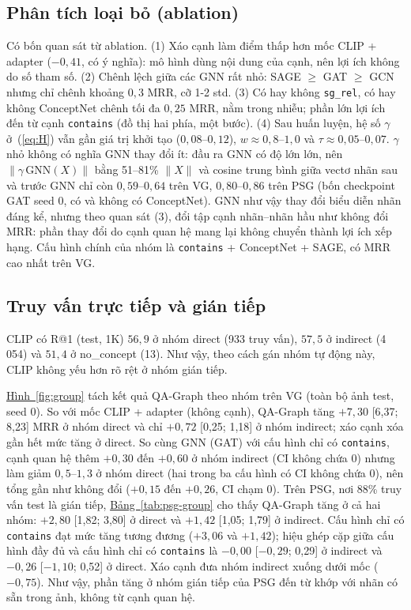 \documentclass[conference]{IEEEtran}
\begin{document}
\subsection{Phân tích loại bỏ (ablation)}\label{sec:r-abl}
Có bốn quan sát từ ablation. (1) Xáo cạnh làm điểm thấp hơn mốc CLIP + adapter ($-0{,}41$, có ý nghĩa): mô hình dùng nội dung của cạnh, nên lợi ích không do số tham số. (2) Chênh lệch giữa các GNN rất nhỏ: SAGE $\ge$ GAT $\ge$ GCN nhưng chỉ chênh khoảng $0{,}3$ MRR, cỡ 1-2 std. (3) Có hay không \texttt{sg\_rel}, có hay không ConceptNet chênh tối đa $0{,}25$ MRR, nằm trong nhiễu; phần lớn lợi ích đến từ cạnh \texttt{contains} (đồ thị hai phía, một bước). (4) Sau huấn luyện, hệ số $\gamma$ ở~(\ref{eq:H}) vẫn gần giá trị khởi tạo ($0{,}08$--$0{,}12$), $w\approx0{,}8$--$1{,}0$ và $\tau\approx0{,}05$--$0{,}07$. $\gamma$ nhỏ không có nghĩa GNN thay đổi ít: đầu ra GNN có độ lớn lớn, nên $\lVert\gamma\,\mathrm{GNN}(X)\rVert$ bằng 51--81\% $\lVert X\rVert$ và cosine trung bình giữa vectơ nhãn sau và trước GNN chỉ còn $0{,}59$--$0{,}64$ trên VG, $0{,}80$--$0{,}86$ trên PSG (bốn checkpoint GAT seed 0, có và không có ConceptNet). GNN như vậy thay đổi biểu diễn nhãn đáng kể, nhưng theo quan sát (3), đổi tập cạnh nhãn--nhãn hầu như không đổi MRR: phần thay đổi do cạnh quan hệ mang lại không chuyển thành lợi ích xếp hạng. Cấu hình chính của nhóm là \texttt{contains} + ConceptNet + SAGE, có MRR cao nhất trên VG.

\subsection{Truy vấn trực tiếp và gián tiếp}\label{sec:r-group}
CLIP có R@1 (test, 1K) $56{,}9$ ở nhóm direct (933 truy vấn), $57{,}5$ ở indirect (4\,054) và $51{,}4$ ở no\_concept (13). Như vậy, theo cách gán nhóm tự động này, CLIP không yếu hơn rõ rệt ở nhóm gián tiếp.

\hyperref[fig:group]{Hình~\ref*{fig:group}} tách kết quả QA-Graph theo nhóm trên VG (toàn bộ ảnh test, seed 0). So với mốc CLIP + adapter (không cạnh), QA-Graph tăng $+7{,}30$ [6,37; 8,23] MRR ở nhóm direct và chỉ $+0{,}72$ [0,25; 1,18] ở nhóm indirect; xáo cạnh xóa gần hết mức tăng ở direct. So cùng GNN (GAT) với cấu hình chỉ có \texttt{contains}, cạnh quan hệ thêm $+0{,}30$ đến $+0{,}60$ ở nhóm indirect (CI không chứa 0) nhưng làm giảm $0{,}5$--$1{,}3$ ở nhóm direct (hai trong ba cấu hình có CI không chứa 0), nên tổng gần như không đổi ($+0{,}15$ đến $+0{,}26$, CI chạm 0). Trên PSG, nơi 88\% truy vấn test là gián tiếp, \hyperref[tab:psg-group]{Bảng~\ref*{tab:psg-group}} cho thấy QA-Graph tăng ở cả hai nhóm: $+2{,}80$ [1,82; 3,80] ở direct và $+1{,}42$ [1,05; 1,79] ở indirect. Cấu hình chỉ có \texttt{contains} đạt mức tăng tương đương ($+3{,}06$ và $+1{,}42$); hiệu ghép cặp giữa cấu hình đầy đủ và cấu hình chỉ có \texttt{contains} là $-0{,}00$ [$-0{,}29$; 0,29] ở indirect và $-0{,}26$ [$-1{,}10$; 0,52] ở direct. Xáo cạnh đưa nhóm indirect xuống dưới mốc ($-0{,}75$). Như vậy, phần tăng ở nhóm gián tiếp của PSG đến từ khớp với nhãn có sẵn trong ảnh, không từ cạnh quan hệ.
\end{document}
